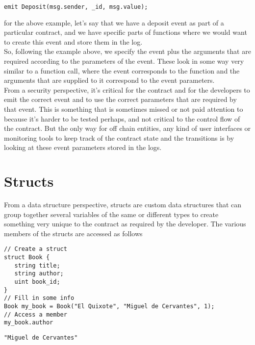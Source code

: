 \begin{lstlisting}[language=Solidity, style=solStyle, caption={Example of Event emission.}]
emit Deposit(msg.sender, _id, msg.value);
\end{lstlisting}

for the above example, let's say that we have a deposit event as part of a particular contract, and we have specific parts of functions where we would want to create this event and store them in the log.\\

So, following the example above, we specify the event plus the arguments that are required according to the parameters of the event.
These look in some way very similar to a function call, where the event corresponds to the function and the arguments that are supplied to it correspond to the event parameters.\\

From a security perspective, it's critical for the contract and for the developers to emit the correct event and to use the correct parameters that are required by that event.
This is something that is sometimes missed or not paid attention to because it's harder to be tested perhaps, and not critical to the control flow of the contract.
But the only way for off chain entities, any kind of user interfaces or monitoring tools to keep track of the contract state and the transitions is by looking at these event parameters stored in the logs.

\section{Structs}
From a data structure perspective, structs are custom data structures that can group together several variables of the same or different types to create something very unique to the contract as required by the developer. The various members of the structs are accessed as follows

\begin{lstlisting}[language=Solidity, style=solStyle, caption={Example of accesing struct members},label={Code_10}]
// Create a struct
struct Book { 
   string title;
   string author;
   uint book_id;
}
// Fill in some info
Book my_book = Book("El Quixote", "Miguel de Cervantes", 1);
// Access a member
my_book.author
\end{lstlisting}

\begin{lstlisting}[language=Solidity, style=solStyle, caption={Output of Code \ref{Code_10}}]
"Miguel de Cervantes"
\end{lstlisting}

